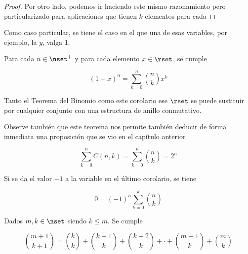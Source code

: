 \begin{proof}
  Por otro lado, podemos ir haciendo este mismo razonamiento pero
  particularizado para aplicaciones que tienen $k$ elementos para cada 



















\end{proof}

Como caso particular, se tiene el caso en el que una de esas variables, por
ejemplo, la $y$, valga 1.

\begin{corollary}
  Para cada $n \in \nset^{+}$ y para cada elemento $x \in \rset$, se cumple

  $$ (1 + x)^n = \sum_{k=0}^n {n \choose k} x^k $$
\end{corollary}

Tanto el Teorema del Binomio como este corolario ese $\rset$ se puede
sustituir por cualquier conjunto con una estructura de anillo conmutativo.

Observe también que este teorema nos permite también deducir de forma
inmediata una proposición que se vio en el capítulo anterior

$$ \sum_{k=0}^n C(n, k) = \sum_{k=0}^n {n \choose k} = 2^n $$

Si se da el valor ${-1}$ a la variable en el último corolario, se tiene

$$ 0 = ({-1})^n \sum_{k=0}^k {n \choose k} $$

\begin{theorem}
  Dados $m, k \in \nset$ siendo $k \leq m$. Se cumple

  $$ {m+1 \choose k+1} = {k \choose k} + {k+1 \choose k} + {k+2 \choose k} +
  \cdot + {m-1 \choose k} + {m \choose k} $$
\end{theorem}

